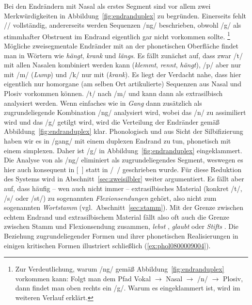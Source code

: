 \begin{exe}
  \ex \label{ex:phol08000090035}
  \begin{xlist}
  \end{xlist}
\end{exe}

Bei den Endrändern mit Nasal als erstes Segment sind vor allem zwei Merkwürdigkeiten in Abbildung~\ref{fig:endranduplex} zu begründen.
Einerseits fehlt // vollständig, andererseits werden Sequenzen /ng/ beschrieben, obwohl /g/ als stimmhafter Obstruent im Endrand eigentlich gar nicht vorkommen sollte.%
\footnote{Zur Verdeutlichung, warum /ng/ gemäß Abbildung~\ref{fig:endranduplex} vorkommen kann:
Folgt man dem Pfad Vokal $\rightarrow$ Nasal $\rightarrow$ /n/ $\rightarrow$ Plosiv, dann findet man oben rechts ein /g/.
Warum es eingeklammert ist, wird im weiteren Verlauf erklärt.}
Mögliche zweisegmentale Endränder mit \textipa{[N]} an der phonetischen Oberfläche findet man in Wörtern wie \textit{hängt}, \textit{krank} und \textit{längs}.
Es fällt zunächst auf, dass zwar /t/ mit allen Nasalen kombiniert werden kann (\textit{klemmt}, \textit{rennt}, \textit{hängt}), /p/ aber nur mit /m/ (\textit{Lump}) und /k/ nur mit \textipa{[N]} (\textit{krank}).
Es liegt der Verdacht nahe, dass hier eigentlich nur homorgane (am selben Ort artikulierte) Sequenzen aus Nasal und Plosiv vorkommen können.
/t/ nach /m/ und \textipa{[N]} kann dann als extrasilbisch analysiert werden.
Wenn einfaches \textipa{[N]} wie in \textit{Gang} dann zusätzlich als zugrundeliegende Kombination /ng/ analysiert wird, wobei das /n/ zu \textipa{[N]} assimiliert wird und das /g/ getilgt wird, wird die Verteilung der Endränder gemäß Abbildung~\ref{fig:endranduplex} klar.
Phonologisch und aus Sicht der Silbifizierung haben wir es in /gang/ mit einem duplexen Endrand zu tun, phonetisch mit einem simplexen.
Daher ist /g/ in Abbildung~\ref{fig:endranduplex} eingeklammert.
Die Analyse von \textipa{[N]} als /ng/ eliminiert \textipa{[N]} als zugrundeliegendes Segment, weswegen es hier auch konsequent in [~] statt in /~/ geschrieben wurde.
Für diese Reduktion des Systems wird in Abschnitt~\ref{sec:zweisilbler} weiter argumentiert.
Es fällt aber auf, dass häufig -- wen auch nicht immer -- extrasilbisches Material (konkret /t/, /s/ oder /st/) zu sogenannten \textit{Flexionsendungen} gehört, also nicht zum sogenannten \textit{Wortstamm} (vgl.\ Abschnitt~\ref{sec:stamm}).
Mit der Grenze zwischen echtem Endrand und extrasilbischem Material fällt also oft auch die Grenze zwischen Stamm und Flexionsendung zusammen, \zB \textit{lebst} \textipa{[le:b+st]}, \textit{glaubt} \textipa{[gl\t{aO}p+t]} oder \textit{Stifts} \textipa{[StIft+s]}.
Die Beziehung zugrundeliegender Formen und ihrer phonetischen Realisierungen in einigen kritischen Formen illustriert schließlich (\ref{ex:phol0800009004}).

